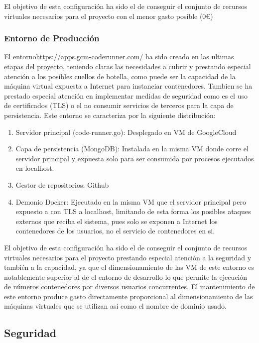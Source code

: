 \documentclass[a4paper,11pt]{book}
\begin{document}
El objetivo de esta configuración ha sido el de conseguir el conjunto de recursos virtuales necesarios para el proyecto con el menor gasto posible (0€)

\subsubsection{Entorno de Producción}

El entorno\url{https://apps.gcm-coderunner.com/} ha sido creado en las ultimas etapas del proyecto, teniendo claras las necesidades a cubrir y prestando especial atención a los posibles cuellos de botella, como puede ser la capacidad de la máquina virtual expuesta a Internet para instanciar contenedores.  Tambien se ha prestado especial atención en implementar medidas de seguridad como es el uso de certificados (TLS) o el no consumir servicios de terceros para la capa de persistencia. Este entorno se caracteriza por la siguiente distribución: 

\begin{enumerate}
\item Servidor principal (code-runner.go): Desplegado en VM de GoogleCloud\cite{gcp}
\item Capa de persistencia (MongoDB): Instalada en la misma VM donde corre el servidor principal y expuesta solo para ser consumida por procesos ejecutados en localhost. 
\item Gestor de repositorios: Github\cite{github}
\item Demonio Docker: Ejecutado en la misma VM que el servidor principal  pero expuesto a con TLS a localhost, limitando de esta forma los posibles ataques externos que reciba el sistema, pues solo se exponen a Internet los contenedores de los usuarios, no el servicio de contenedores en si. 
\end{enumerate}


El objetivo de esta configuración ha sido el de conseguir el conjunto de recursos virtuales necesarios para el proyecto prestando especial atención a la seguridad y también a la capacidad, ya que el dimensionamiento de las VM de este entorno es notablemente superior al de el entorno de desarrollo lo que permite la ejecución de números contenedores por diversos usuarios concurrentes.  El mantenimiento de este entorno produce gasto directamente proporcional al dimensionamiento de las máquinas virtuales que se utilizan así como el nombre de dominio usado. 

\subsection{Seguridad}
\end{document}
